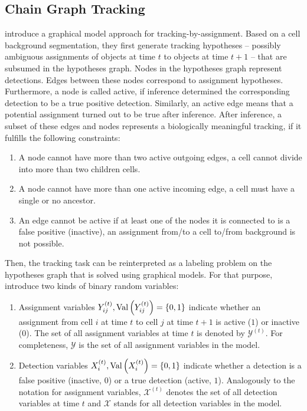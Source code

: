 \subsection{Chain Graph Tracking}
\label{subsec:fg-chaingraph}
\citet{kausler_12_discrete} introduce a graphical model approach for tracking-by-assignment. Based
on a cell \vs background segmentation, they first generate tracking hypotheses -- \ie possibly
ambiguous assignments of objects at time $t$ to objects at time $t+1$ -- that are subsumed in the
hypotheses graph. Nodes in the hypotheses graph represent detections. Edges between these nodes
correspond to assignment hypotheses. Furthermore, a node is called active, if inference determined
the corresponding detection to be a true positive detection. Similarly, an active edge means that a
potential assignment turned out to be true after inference. After inference, a subset of these edges
and nodes represents a biologically meaningful tracking, if it fulfills the following constraints:
\begin{enumerate}
      \item A node cannot have more than two active outgoing edges, \ie a cell cannot divide into
    more than two children cells.
      \item A node cannot have more than one active incoming edge, \ie a cell must have a single or
    no ancestor.
      \item An edge cannot be active if at least one of the nodes it is connected to is
    a false positive (inactive), \ie an assignment from/to a cell to/from background is not possible.
\end{enumerate}
Then, the tracking task can be reinterpreted as a labeling problem on the hypotheses graph that is
solved using graphical models.  For that purpose, \citet{kausler_12_discrete} introduce two kinds of
binary random variables:
\begin{enumerate}
      \item Assignment variables $Y_{ij}^{(t)}, \operatorname{Val}\left(Y_{ij}^{(t)}\right)=\{0,1\}$ indicate whether an
    assignment from cell $i$ at time $t$ to cell $j$ at time $t+1$ is active ($1$) or inactive
    ($0$). The set of all assignment variables at time $t$ is denoted by $\mathcal{Y}^{(t)}$. For
    completeness, $\mathcal{Y}$ is the set of all assignment variables in the model.
      \item Detection variables $X_i^{(t)}, \operatorname{Val}\left(X_i^{(t)}\right)=\{0,1\}$ indicate whether a detection
    is a false positive (inactive, $0$) or a true detection (active, $1$). Analogously to the
    notation for assignment variables, $\mathcal{X}^{(t)}$ denotes the set of all detection
    variables at time $t$ and $\mathcal{X}$ stands for all detection variables in the model.
\end{enumerate}

